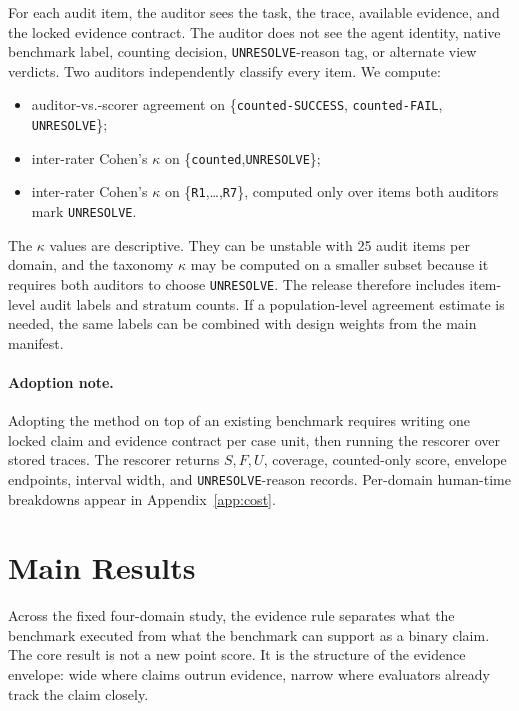 \documentclass{article}
\begin{document}
For each audit item, the auditor sees the task, the trace, available evidence,
and the locked evidence contract. The auditor does not see the agent identity,
native benchmark label, counting decision, \texttt{UNRESOLVE}-reason tag, or
alternate view verdicts. Two auditors independently classify every item. We
compute:
\begin{itemize}\itemsep0.1em
\item auditor-vs.-scorer agreement on
\{\texttt{counted-SUCCESS}, \texttt{counted-FAIL}, \texttt{UNRESOLVE}\};
\item inter-rater Cohen's \(\kappa\) on \{\texttt{counted},\texttt{UNRESOLVE}\};
\item inter-rater Cohen's \(\kappa\) on \{\texttt{R1},\ldots,\texttt{R7}\},
computed only over items both auditors mark \texttt{UNRESOLVE}.
\end{itemize}

The \(\kappa\) values are descriptive. They can be unstable with 25 audit items
per domain, and the taxonomy \(\kappa\) may be computed on a smaller subset
because it requires both auditors to choose \texttt{UNRESOLVE}. The release
therefore includes item-level audit labels and stratum counts. If a
population-level agreement estimate is needed, the same labels can be combined
with design weights from the main manifest.

\paragraph{Adoption note.}
Adopting the method on top of an existing benchmark requires writing one locked
claim and evidence contract per case unit, then running the rescorer over stored
traces. The rescorer returns \(S,F,U\), coverage, counted-only score, envelope
endpoints, interval width, and \texttt{UNRESOLVE}-reason records. Per-domain
human-time breakdowns appear in Appendix~\ref{app:cost}.

\section{Main Results}
\label{sec:main-results}

Across the fixed four-domain study, the evidence rule separates what the
benchmark executed from what the benchmark can support as a binary claim. The
core result is not a new point score. It is the structure of the evidence
envelope: wide where claims outrun evidence, narrow where evaluators already
track the claim closely.
\end{document}
